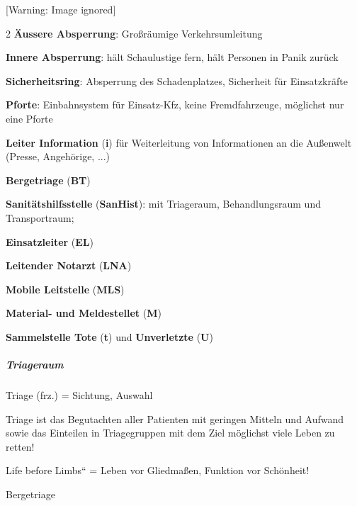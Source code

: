 \documentclass{article}
\makeatletter
\newcommand\gT[1]{\textbf{\textup{\textcolor[rgb]{0.0,0.5019608,0.0}{#1}}}}
\newcommand\captionof[1]{\def\@captype{#1}\caption}
\makeatother
\begin{document}
{\centering \begin{minipage}{12.605cm}
 [Warning: Image ignored] %
\captionof{figure}[Gliederung des Einsatzraumes]{Gliederung des
Einsatzraumes}
\begin{multicols}{2}
{\mdseries\upshape
\gT{\"Aussere Absperrung}: Gro{\ss}r\"aumige
Verkehrsumleitung}

{\mdseries\upshape
\gT{Innere Absperrung}: h\"alt Schaulustige fern, h\"alt
Personen in Panik zur\"uck}

{\mdseries\upshape
\gT{Sicherheitsring}: Absperrung des Schadenplatzes,
Sicherheit f\"ur Einsatzkr\"afte}

{\mdseries\upshape
\gT{Pforte}: Einbahnsystem f\"ur Einsatz-Kfz, keine
Fremdfahrzeuge, m\"oglichst nur eine Pforte }

{\mdseries\upshape
\gT{Leiter Information} (\gT{i}) f\"ur
Weiterleitung von Informationen an die Au{\ss}enwelt (Presse,
Angeh\"orige, ...)}

{\mdseries\upshape
\gT{Bergetriage} (\gT{BT}) }

{\mdseries\upshape
\gT{Sanit\"atshilfsstelle} (\gT{SanHist}):
mit Triageraum, Behandlungsraum und Transportraum;}

{\mdseries\upshape
\gT{Einsatzleiter} (\gT{EL}) }

{\mdseries\upshape
\gT{Leitender Notarzt} (\gT{LNA})}

{\mdseries\upshape
\gT{Mobile Leitstelle} (\gT{MLS}) }

{\mdseries\upshape
\gT{Material- und Meldestellet} (\gT{M})}

{\mdseries\upshape
\gT{Sammelstelle Tote} (\gT{t}) und
\gT{Unverletzte} (\gT{U}) }

\end{multicols}
\end{minipage}\par}

\subparagraph{Triageraum}
{\mdseries
Triage (frz.) = Sichtung, Auswahl}

{\mdseries
Triage ist das Begutachten aller Patienten mit geringen Mitteln und
Aufwand sowie das Einteilen in Triagegruppen mit dem Ziel m\"oglichst
viele Leben zu retten!}

{\mdseries
{\quotedblbase}Life before Limbs{\textquotedblleft} = Leben vor
Gliedma{\ss}en, Funktion vor Sch\"onheit!}

{\mdseries\color{black}
Bergetriage}
\end{document}
